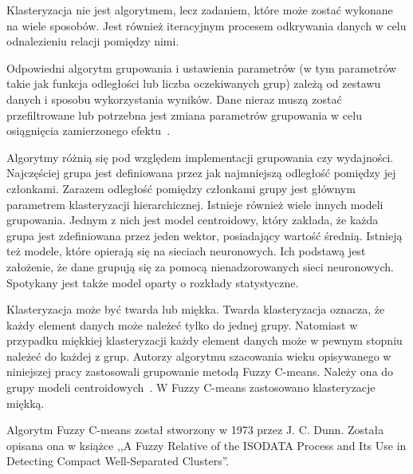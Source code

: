 \documentclass[a4paper,twoside,12pt]{book}
\begin{document}
    Klasteryzacja nie jest algorytmem, lecz zadaniem, które może zostać wykonane na wiele sposobów.
    Jest również iteracyjnym procesem odkrywania danych w celu odnalezieniu relacji pomiędzy nimi.

    Odpowiedni algorytm grupowania i ustawienia parametrów (w tym parametrów
    takie jak funkcja odległości lub liczba oczekiwanych grup)
    zależą od zestawu danych i sposobu wykorzystania wyników.
    Dane nieraz muszą zostać przefiltrowane lub potrzebna jest zmiana parametrów grupowania w celu osiągnięcia
    zamierzonego efektu~\cite{clusterWstep}.

    Algorytmy różnią się pod względem implementacji grupowania czy wydajności.
    Najczęściej grupa jest definiowana przez jak najmniejszą odległość pomiędzy jej członkami.
    Zarazem odległość pomiędzy członkami grupy jest głównym parametrem klasteryzacji hierarchicznej.
    Istnieje również wiele innych modeli grupowania.
    Jednym z nich jest model centroidowy,
    który zakłada, że każda grupa jest zdefiniowana przez jeden wektor, posiadający wartość średnią.
    Istnieją też modele, które opierają się na sieciach neuronowych.
    Ich podstawą jest założenie, że dane grupują się za pomocą nienadzorowanych sieci neuronowych.
    Spotykany jest także model oparty o rozkłady statystyczne.

    Klasteryzacja może być twarda lub miękka.
    Twarda klasteryzacja oznacza, że każdy element danych może należeć tylko do jednej grupy.
    Natomiast w przypadku miękkiej klasteryzacji każdy element danych może w pewnym stopniu należeć do każdej z grup.
    Autorzy algorytmu szacowania wieku opisywanego w niniejszej pracy zastosowali grupowanie metodą Fuzzy C-means.
    Należy ona do grupy modeli centroidowych~\cite{clusterWstep}. W Fuzzy C-means zastosowano klasteryzacje miękką.

    Algorytm Fuzzy C-means został stworzony w 1973 przez J. C. Dunn. Została opisana ona w książce
    ,,A Fuzzy Relative of the ISODATA Process and Its Use in Detecting Compact Well-Separated Clusters''.
\end{document}
